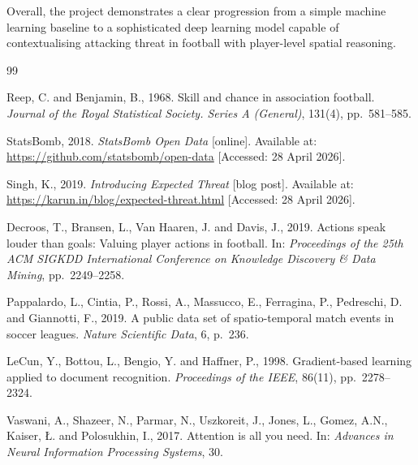 \documentclass{article}
\begin{document}
Overall, the project demonstrates a clear progression from a simple machine learning baseline to a sophisticated deep learning model capable of contextualising attacking threat in football with player-level spatial reasoning.


\begin{thebibliography}{99}

Reep, C. and Benjamin, B., 1968. Skill and chance in association football. \textit{Journal of the Royal Statistical Society. Series A (General)}, 131(4), pp.\ 581--585.

StatsBomb, 2018. \textit{StatsBomb Open Data} [online]. Available at: \url{https://github.com/statsbomb/open-data} [Accessed: 28 April 2026].

Singh, K., 2019. \textit{Introducing Expected Threat} [blog post]. Available at: \url{https://karun.in/blog/expected-threat.html} [Accessed: 28 April 2026].

Decroos, T., Bransen, L., Van Haaren, J. and Davis, J., 2019. Actions speak louder than goals: Valuing player actions in football. In: \textit{Proceedings of the 25th ACM SIGKDD International Conference on Knowledge Discovery \& Data Mining}, pp.\ 2249--2258.

Pappalardo, L., Cintia, P., Rossi, A., Massucco, E., Ferragina, P., Pedreschi, D. and Giannotti, F., 2019. A public data set of spatio-temporal match events in soccer leagues. \textit{Nature Scientific Data}, 6, p.\ 236.

LeCun, Y., Bottou, L., Bengio, Y. and Haffner, P., 1998. Gradient-based learning applied to document recognition. \textit{Proceedings of the IEEE}, 86(11), pp.\ 2278--2324.

Vaswani, A., Shazeer, N., Parmar, N., Uszkoreit, J., Jones, L., Gomez, A.N., Kaiser, \L. and Polosukhin, I., 2017. Attention is all you need. In: \textit{Advances in Neural Information Processing Systems}, 30.


\end{thebibliography}
\end{document}
